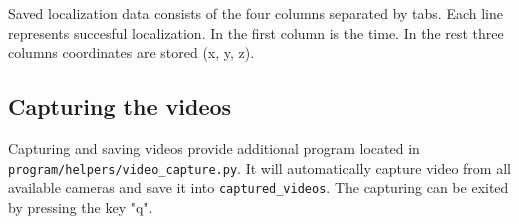Saved localization data consists of the four columns separated by tabs. Each
line represents succesful localization. In the first column is the time. In the
rest three columns coordinates are stored (x, y, z).

\subsection{Capturing the videos} 

Capturing and saving videos provide additional program located in
\verb+program/helpers/video_capture.py+. It will automatically capture video
from all available cameras and save it into \verb+captured_videos+. The
capturing can be exited by pressing the key "q".

